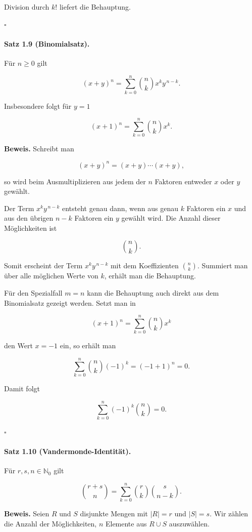 \documentclass{article}
\begin{document}
Division durch \(k!\) liefert die Behauptung. 

\hfill\(\square\)

\paragraph{Satz 1.9 (Binomialsatz).}
Für \(n\ge 0\) gilt

\[
(x+y)^n
=
\sum_{k=0}^{n}
\binom{n}{k}
x^k y^{\,n-k}.
\]

Insbesondere folgt für \(y=1\)

\[
(x+1)^n
=
\sum_{k=0}^{n}
\binom{n}{k}
x^k .
\]

\textbf{Beweis.}
Schreibt man

\[
(x+y)^n=(x+y)\cdots(x+y),
\]

so wird beim Ausmultiplizieren aus jedem der \(n\) Faktoren entweder
\(x\) oder \(y\) gewählt.

Der Term \(x^k y^{\,n-k}\) entsteht genau dann, wenn aus genau \(k\)
Faktoren ein \(x\) und aus den übrigen \(n-k\) Faktoren ein \(y\)
gewählt wird. Die Anzahl dieser Möglichkeiten ist

\[
\binom{n}{k}.
\]

Somit erscheint der Term \(x^k y^{\,n-k}\) mit dem Koeffizienten
\(\binom{n}{k}\). Summiert man über alle möglichen Werte von \(k\),
erhält man die Behauptung.

Für den Spezialfall \(m=n\) kann die Behauptung auch direkt aus dem
Binomialsatz gezeigt werden. Setzt man in

\[
(x+1)^n
=
\sum_{k=0}^{n}
\binom{n}{k}x^k
\]

den Wert \(x=-1\) ein, so erhält man

\[
\sum_{k=0}^{n}
\binom{n}{k}(-1)^k
=
(-1+1)^n
=
0.
\]

Damit folgt

\[
\sum_{k=0}^{n}
(-1)^k
\binom{n}{k}
=
0.
\]

\hfill\(\square\)

\paragraph{Satz 1.10 (Vandermonde-Identität).}
Für \(r,s,n\in\mathbb N_0\) gilt

\[
\binom{r+s}{n}
=
\sum_{k=0}^{n}
\binom{r}{k}
\binom{s}{n-k}.
\]

\textbf{Beweis.}
Seien \(R\) und \(S\) disjunkte Mengen mit
\(|R|=r\) und \(|S|=s\).
Wir zählen die Anzahl der Möglichkeiten, \(n\) Elemente aus
\(R\cup S\) auszuwählen.
\end{document}
